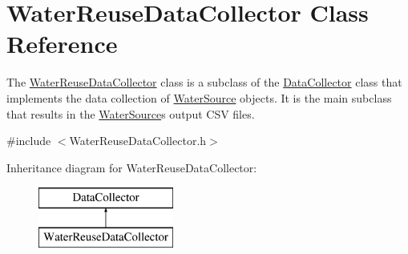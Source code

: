 \hypertarget{classWaterReuseDataCollector}{}\section{Water\+Reuse\+Data\+Collector Class Reference}
\label{classWaterReuseDataCollector}


The {\ttfamily \mbox{\hyperlink{classWaterReuseDataCollector}{Water\+Reuse\+Data\+Collector}}} class is a subclass of the {\ttfamily \mbox{\hyperlink{classDataCollector}{Data\+Collector}}} class that implements the data collection of \mbox{\hyperlink{classWaterSource}{Water\+Source}} objects. It is the main subclass that results in the \mbox{\hyperlink{classWaterSource}{Water\+Source}}\textquotesingle{}s output C\+SV files.  




{\ttfamily \#include $<$Water\+Reuse\+Data\+Collector.\+h$>$}

Inheritance diagram for Water\+Reuse\+Data\+Collector\+:\begin{figure}[H]
\begin{center}
\leavevmode
\includegraphics[height=2.000000cm]{classWaterReuseDataCollector}
\end{center}
\end{figure}

